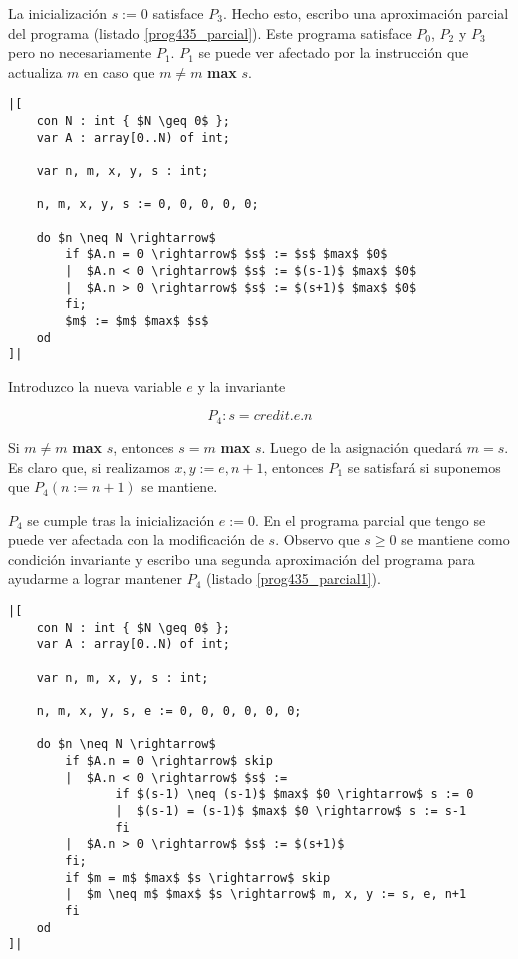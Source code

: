 \documentclass{article}
\begin{document}
La inicialización $s := 0$ satisface $P_3$.
Hecho esto, escribo una aproximación parcial del programa (listado \ref{prog435_parcial}). Este programa
satisface $P_0$, $P_2$ y $P_3$ pero no necesariamente $P_1$. $P_1$ se puede ver afectado por la instrucción
que actualiza $m$ en caso que $m \neq m$ {\bf max} $s$.

\begin{lstlisting}[float,caption={Primera solución parcial del ejercicio 4.3.5},label=prog435_parcial]
|[
    con N : int { $N \geq 0$ };
    var A : array[0..N) of int;

    var n, m, x, y, s : int;

    n, m, x, y, s := 0, 0, 0, 0, 0;

    do $n \neq N \rightarrow$
        if $A.n = 0 \rightarrow$ $s$ := $s$ $max$ $0$
        |  $A.n < 0 \rightarrow$ $s$ := $(s-1)$ $max$ $0$
        |  $A.n > 0 \rightarrow$ $s$ := $(s+1)$ $max$ $0$
        fi;
        $m$ := $m$ $max$ $s$
    od
]|
\end{lstlisting}

Introduzco la nueva variable $e$ y la invariante

$$
P_4: s = credit.e.n
$$

Si $m \neq m$ {\bf max} $s$, entonces $s = m$ {\bf max} $s$. Luego de la asignación quedará $m = s$.
Es claro que, si realizamos $x, y := e, n+1$, entonces $P_1$ se satisfará si suponemos que $P_4(n := n+1)$ se
mantiene.

$P_4$ se cumple tras la inicialización $e := 0$. En el programa parcial que tengo se
puede ver afectada con la modificación de $s$. Observo que $s \geq 0$ se mantiene como
condición invariante y escribo una segunda aproximación del programa para ayudarme a lograr mantener
$P_4$ (listado \ref{prog435_parcial1}).

\begin{lstlisting}[float,caption={Segunda solución parcial del ejercicio 4.3.5},label=prog435_parcial1]
|[
    con N : int { $N \geq 0$ };
    var A : array[0..N) of int;

    var n, m, x, y, s : int;

    n, m, x, y, s, e := 0, 0, 0, 0, 0, 0;

    do $n \neq N \rightarrow$
        if $A.n = 0 \rightarrow$ skip
        |  $A.n < 0 \rightarrow$ $s$ :=
               if $(s-1) \neq (s-1)$ $max$ $0 \rightarrow$ s := 0
               |  $(s-1) = (s-1)$ $max$ $0 \rightarrow$ s := s-1
               fi
        |  $A.n > 0 \rightarrow$ $s$ := $(s+1)$
        fi;
        if $m = m$ $max$ $s \rightarrow$ skip
        |  $m \neq m$ $max$ $s \rightarrow$ m, x, y := s, e, n+1
        fi
    od
]|
\end{lstlisting}
\end{document}
